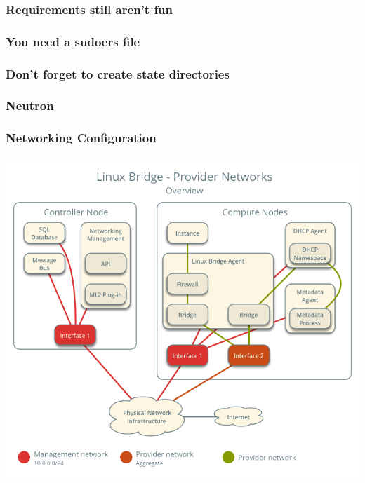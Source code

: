 \documentclass[aspectratio=169,11pt,hyperref={colorlinks=true}]{beamer}
\begin{document}
\begin{frame}
    \frametitle{Requirements still aren't fun}
    
\end{frame}

\begin{frame}
    \frametitle{You need a  sudoers file}
    
\end{frame}

\begin{frame}
    \frametitle{Don't forget to create state directories}
    
\end{frame}

\subsubsection{Neutron}
\begin{frame}
    \frametitle{Networking Configuration}
    \centering
    \includegraphics[width=.7\textwidth]{deploy-lb-provider-overview.png}
\end{frame}
\end{document}
